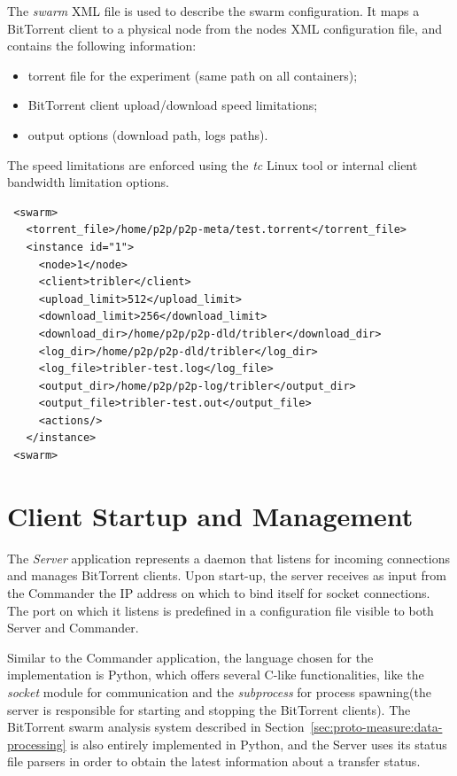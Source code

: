 The \textit{swarm} XML file is used to describe the swarm configuration. It
maps a BitTorrent client to a physical node from the nodes XML configuration
file, and contains the following information:

\begin{itemize}
  \item torrent file for the experiment (same path on all containers);
  \item BitTorrent client upload/download speed limitations;
  \item output options (download path, logs paths).
\end{itemize}

The speed limitations are enforced using the \textit{tc} Linux tool or
internal client bandwidth limitation options.

\scriptsize
\begin{verbatim}
 <swarm>
   <torrent_file>/home/p2p/p2p-meta/test.torrent</torrent_file>
   <instance id="1">
     <node>1</node>
     <client>tribler</client>
     <upload_limit>512</upload_limit>
     <download_limit>256</download_limit>
     <download_dir>/home/p2p/p2p-dld/tribler</download_dir>
     <log_dir>/home/p2p/p2p-dld/tribler</log_dir>
     <log_file>tribler-test.log</log_file>
     <output_dir>/home/p2p/p2p-log/tribler</output_dir>
     <output_file>tribler-test.out</output_file>
     <actions/>
   </instance>
 <swarm>
\end{verbatim}
\normalsize

\section{Client Startup and Management}
\label{sec:deploy-startup}

The \textit{Server} application represents a daemon that listens for incoming
connections and manages BitTorrent clients. Upon start-up, the server receives
as input from the Commander the IP address on which to bind itself for socket
connections. The port on which it listens is predefined in a configuration
file visible to both Server and Commander.

Similar to the Commander application, the language chosen for the
implementation is Python, which offers several C-like functionalities, like
the \textit{socket} module for communication and the \textit{subprocess} for
process spawning(the server is responsible for starting and stopping the
BitTorrent clients). The BitTorrent swarm analysis system described in
Section~\ref{sec:proto-measure:data-processing} is also entirely implemented
in Python, and the Server uses its status file parsers in order to obtain the
latest information about a transfer status.

